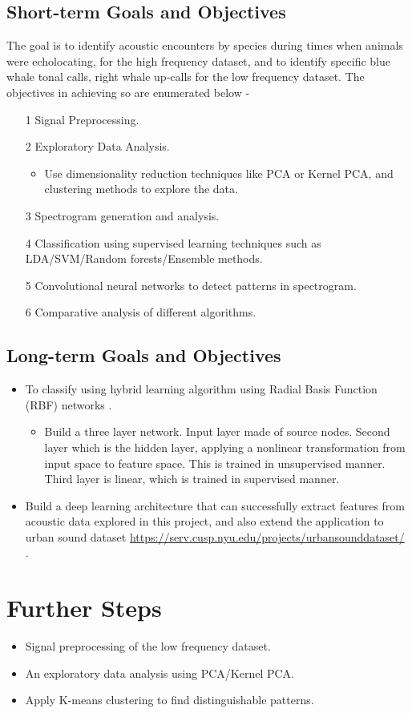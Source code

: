 \documentclass[final]{article}
\begin{document}
\subsection{Short-term Goals and Objectives}
The goal is to identify acoustic encounters by species during times when animals were echolocating, for the high frequency dataset, and to identify specific blue whale tonal calls, right whale up-calls for the low frequency dataset. The objectives in achieving so are enumerated below -
\begin{itemize}
\item[1] Signal Preprocessing.
\item[2] Exploratory Data Analysis.
\begin{itemize} 
\item Use dimensionality reduction techniques like PCA or Kernel PCA, and clustering methods to explore the data. 
\end{itemize}
\item[3] Spectrogram generation and analysis. 
\item[4] Classification using supervised learning techniques such as LDA/SVM/Random forests/Ensemble methods.
\item[5] Convolutional neural networks to detect patterns in spectrogram.
\item[6] Comparative analysis of different algorithms.
\end{itemize}

\subsection{Long-term Goals and Objectives}
\begin{itemize}
\item To classify using hybrid learning algorithm using Radial Basis Function (RBF) networks \citep{haykin2009neural}. 
\begin{itemize}
\item Build a three layer network. Input layer made of source nodes. Second layer which is the hidden layer, applying a nonlinear transformation from input space to feature space. This is trained in unsupervised manner. Third layer is linear, which is trained in supervised manner.
\end{itemize}
\item Build a deep learning architecture that can successfully extract features from acoustic data explored in this project, and also extend the application to urban sound dataset \url{https://serv.cusp.nyu.edu/projects/urbansounddataset/} \citep{salamon2015unsupervised}.
\end{itemize}

\section{Further Steps}
\begin{itemize}
\item Signal preprocessing of the low frequency dataset. 
\item An exploratory data analysis using PCA/Kernel PCA. 
\item Apply K-means clustering to find distinguishable patterns.
\end{itemize}


\end{document}
